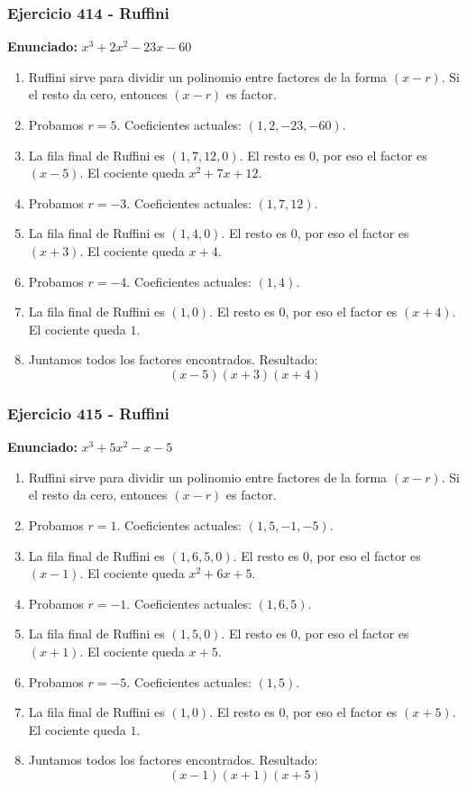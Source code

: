 \documentclass[11pt,a4paper]{article}
\begin{document}
\vspace{0.2cm}
\subsubsection*{Ejercicio 414 - Ruffini}
\textbf{Enunciado:} $ x^{3} + 2 x^{2} - 23 x - 60 $\par
\begin{enumerate}[leftmargin=2em]
\item Ruffini sirve para dividir un polinomio entre factores de la forma \((x-r)\). Si el resto da cero, entonces \((x-r)\) es factor.
\item Probamos \(r=5\). Coeficientes actuales: \((1, 2, -23, -60)\).
\item La fila final de Ruffini es \((1, 7, 12, 0)\). El resto es \(0\), por eso el factor es \((x-5)\). El cociente queda \(x^{2} + 7 x + 12\).
\item Probamos \(r=-3\). Coeficientes actuales: \((1, 7, 12)\).
\item La fila final de Ruffini es \((1, 4, 0)\). El resto es \(0\), por eso el factor es \((x+3)\). El cociente queda \(x + 4\).
\item Probamos \(r=-4\). Coeficientes actuales: \((1, 4)\).
\item La fila final de Ruffini es \((1, 0)\). El resto es \(0\), por eso el factor es \((x+4)\). El cociente queda \(1\).
\item Juntamos todos los factores encontrados. Resultado: \[\boxed{\left(x - 5\right) \left(x + 3\right) \left(x + 4\right)}\]
\end{enumerate}

\vspace{0.2cm}
\subsubsection*{Ejercicio 415 - Ruffini}
\textbf{Enunciado:} $ x^{3} + 5 x^{2} - x - 5 $\par
\begin{enumerate}[leftmargin=2em]
\item Ruffini sirve para dividir un polinomio entre factores de la forma \((x-r)\). Si el resto da cero, entonces \((x-r)\) es factor.
\item Probamos \(r=1\). Coeficientes actuales: \((1, 5, -1, -5)\).
\item La fila final de Ruffini es \((1, 6, 5, 0)\). El resto es \(0\), por eso el factor es \((x-1)\). El cociente queda \(x^{2} + 6 x + 5\).
\item Probamos \(r=-1\). Coeficientes actuales: \((1, 6, 5)\).
\item La fila final de Ruffini es \((1, 5, 0)\). El resto es \(0\), por eso el factor es \((x+1)\). El cociente queda \(x + 5\).
\item Probamos \(r=-5\). Coeficientes actuales: \((1, 5)\).
\item La fila final de Ruffini es \((1, 0)\). El resto es \(0\), por eso el factor es \((x+5)\). El cociente queda \(1\).
\item Juntamos todos los factores encontrados. Resultado: \[\boxed{\left(x - 1\right) \left(x + 1\right) \left(x + 5\right)}\]
\end{enumerate}
\end{document}
